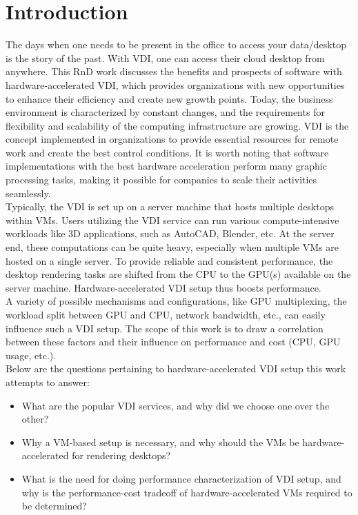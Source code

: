 \documentclass[a4paper,12pt, final]{report}
\begin{document}
\tableofcontents
{}
\listoffigures

\begingroup
\let\clearpage\relax
\listoftables
\endgroup

\chapter{Introduction}

The days when one needs to be present in the office to access your data/desktop is the story of the past. With VDI, one can access their cloud desktop from anywhere. This RnD work discusses the benefits and prospects of software with hardware-accelerated VDI, which provides organizations with new opportunities to enhance their efficiency and create new growth points. Today, the business environment is characterized by constant changes, and the requirements for flexibility and scalability of the computing infrastructure are growing. VDI is the concept implemented in organizations to provide essential resources for remote work and create the best control conditions. It is worth noting that software implementations with the best hardware acceleration perform many graphic processing tasks, making it possible for companies to scale their activities seamlessly.\\

\noindent Typically, the VDI is set up on a server machine that hosts multiple desktops within VMs. Users utilizing the VDI service can run various compute-intensive workloads like 3D applications, such as AutoCAD, Blender, etc. At the server end, these computations can be quite heavy, especially when multiple VMs are hosted on a single server. To provide reliable and consistent performance, the desktop rendering tasks are shifted from the CPU to the GPU(s) available on the server machine. Hardware-accelerated VDI setup thus boosts performance.\\

\noindent A variety of possible mechanisms and configurations, like GPU multiplexing, the workload split between GPU and CPU, network bandwidth, etc., can easily influence such a VDI setup. The scope of this work is to draw a correlation between these factors and their influence on performance and cost (CPU, GPU usage, etc.).\\

\noindent Below are the questions pertaining to hardware-accelerated VDI setup this work attempts to answer:
\begin{itemize}
    \item What are the popular VDI services, and why did we choose one over the other?
    \item Why a VM-based setup is necessary, and why should the VMs be hardware-accelerated for rendering desktops?
    \item What is the need for doing performance characterization of VDI setup, and why is the performance-cost tradeoff of hardware-accelerated VMs required to be determined?
\end{itemize}
\end{document}
